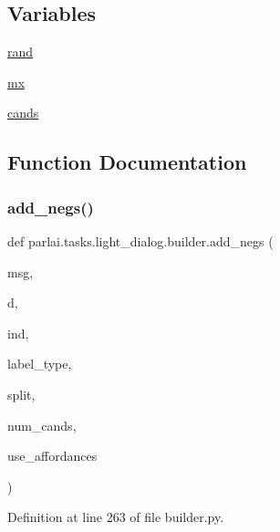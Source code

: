 \subsection*{Variables}
\begin{DoxyCompactItemize}
\item 
\hyperlink{namespaceparlai_1_1tasks_1_1light__dialog_1_1builder_a1a5f7c29e2ac62fb237eef07ae9815c1}{rand}
\item 
\hyperlink{namespaceparlai_1_1tasks_1_1light__dialog_1_1builder_a8b4522952b8ecc117e46da456d5754b4}{mx}
\item 
\hyperlink{namespaceparlai_1_1tasks_1_1light__dialog_1_1builder_ae50feb1d704c383270ea1e4b3a4c85d6}{cands}
\end{DoxyCompactItemize}


\subsection{Function Documentation}
\mbox{\label{namespaceparlai_1_1tasks_1_1light__dialog_1_1builder_a2f5cb4927740a90c9fba84df5e8e16b5}} 
\subsubsection{\texorpdfstring{add\+\_\+negs()}{add\_negs()}}
{\footnotesize\ttfamily def parlai.\+tasks.\+light\+\_\+dialog.\+builder.\+add\+\_\+negs (\begin{DoxyParamCaption}\item[{}]{msg,  }\item[{}]{d,  }\item[{}]{ind,  }\item[{}]{label\+\_\+type,  }\item[{}]{split,  }\item[{}]{num\+\_\+cands,  }\item[{}]{use\+\_\+affordances }\end{DoxyParamCaption})}



Definition at line 263 of file builder.\+py.


